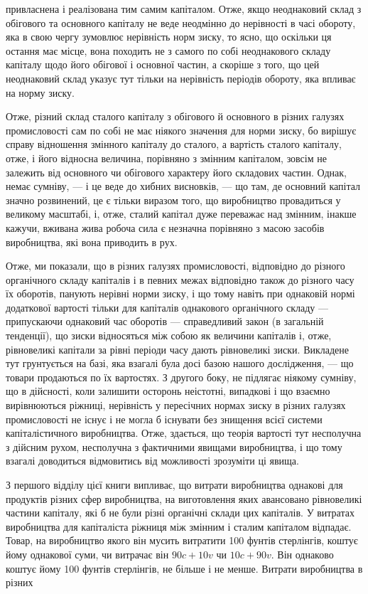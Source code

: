 \parcont{}  %
привласнена і реалізована тим самим капіталом. Отже, якщо неоднаковий склад з обігового та основного
капіталу не веде неодмінно до нерівності в часі обороту, яка в свою чергу зумовлює нерівність норм
зиску, то ясно, що оскільки ця остання
має місце, вона походить не з самого по собі неоднакового
складу капіталу щодо його обігової і основної частин, а скоріше
з того, що цей неоднаковий склад указує тут тільки на нерівність періодів обороту, яка впливає на
норму зиску.

Отже, різний склад сталого капіталу з обігового й основного
в різних галузях промисловості сам по собі не має ніякого значення для норми зиску, бо вирішує
справу відношення змінного капіталу до сталого, а вартість сталого капіталу, отже, і його
відносна величина, порівняно з змінним капіталом, зовсім не залежить від основного чи обігового
характеру його складових
частин. Однак, немає сумніву, — і це веде до хибних висновків, — що там, де основний капітал значно
розвинений, це є
тільки виразом того, що виробництво провадиться у великому
масштабі, і, отже, сталий капітал дуже переважає над змінним,
інакше кажучи, вживана жива робоча сила є незначна порівняно з масою засобів виробництва, які вона
приводить в рух.

Отже, ми показали, що в різних галузях промисловості, відповідно до різного органічного складу
капіталів і в певних
межах відповідно також до різного часу їх оборотів, панують
нерівні норми зиску, і що тому навіть при однаковій нормі додаткової вартості тільки для капіталів
однакового органічного
складу — припускаючи однаковий час оборотів — справедливий
закон (в загальній тенденції), що зиски відносяться між собою
як величини капіталів і, отже, рівновеликі капітали за рівні
періоди часу дають рівновеликі зиски. Викладене тут грунтується
на базі, яка взагалі була досі базою нашого дослідження, — що товари продаються по їх вартостях. З
другого боку, не підлягає ніякому сумніву, що в дійсності, коли залишити осторонь
неістотні, випадкові і що взаємно вирівнюються ріжниці, нерівність у пересічних нормах зиску в
різних галузях промисловості не існує і не могла б існувати без знищення всієї системи
капіталістичного виробництва. Отже, здається, що теорія вартості тут несполучна з дійсним рухом,
несполучна
з фактичними явищами виробництва, і що тому взагалі доводиться відмовитись від можливості зрозуміти
ці явища.

З першого відділу цієї книги випливає, що витрати виробництва однакові для продуктів різних сфер
виробництва, на виготовлення яких авансовано рівновеликі частини капіталу, які б
не були різні органічні склади цих капіталів. У витратах виробництва для капіталіста ріжниця між
змінним і сталим капіталом
відпадає. Товар, на виробництво якого він мусить витратити
100 фунтів стерлінгів, коштує йому однакової суми, чи витрачає
він $90 c + 10 v$ чи $10 c + 90 v$. Він однаково коштує йому 100 фунтів
стерлінгів, не більше і не менше. Витрати виробництва в різних
\parbreak{}  %
